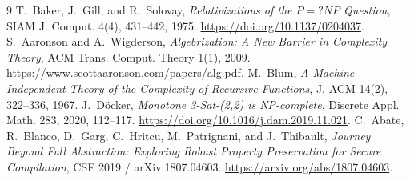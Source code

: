 \documentclass[11pt]{article}
\begin{document}
\begin{thebibliography}{9}
 T.~Baker, J.~Gill, and R.~Solovay,
\emph{Relativizations of the $P=?NP$ Question}, SIAM J. Comput. 4(4),
431--442, 1975. \url{https://doi.org/10.1137/0204037}.
 S.~Aaronson and A.~Wigderson,
\emph{Algebrization: A New Barrier in Complexity Theory}, ACM Trans.
Comput. Theory 1(1), 2009. \url{https://www.scottaaronson.com/papers/alg.pdf}.
 M.~Blum,
\emph{A Machine-Independent Theory of the Complexity of Recursive Functions},
J. ACM 14(2), 322--336, 1967.
 J.~D\"ocker,
\emph{Monotone 3-Sat-(2,2) is NP-complete}, Discrete Appl. Math. 283,
2020, 112--117. \url{https://doi.org/10.1016/j.dam.2019.11.021}.
 C.~Abate, R.~Blanco, D.~Garg, C.~Hritcu,
M.~Patrignani, and J.~Thibault,
\emph{Journey Beyond Full Abstraction: Exploring Robust Property Preservation
for Secure Compilation}, CSF 2019 / arXiv:1807.04603.
\url{https://arxiv.org/abs/1807.04603}.
\end{thebibliography}
\end{document}
